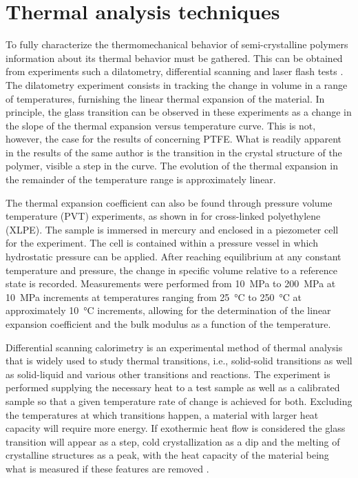 \section{Thermal analysis techniques}

To fully characterize the thermomechanical behavior of semi-crystalline polymers information about its thermal behavior must be gathered.
This can be obtained from experiments such a dilatometry, differential scanning and laser flash tests \citep{blummCharacterizationPTFEUsing2010}.
The dilatometry experiment consists in tracking the change in volume in a range of temperatures, furnishing the linear thermal expansion of the material.
In principle, the glass transition can be observed in these experiments as a change in the slope of the thermal expansion versus temperature curve.
This is not, however, the case for the results of \cite{blummCharacterizationPTFEUsing2010} concerning PTFE.
What is readily apparent in the results of the same author is the transition in the crystal structure of the polymer, visible a step in the curve.
The evolution of the thermal expansion in the remainder of the temperature range is approximately linear.

The thermal expansion coefficient can also be found through pressure volume temperature (PVT) experiments, as shown in \cite{olaszViscoelasticModelCrossLinked2005} for cross-linked polyethylene (XLPE).
The sample is immersed in mercury and enclosed in a piezometer cell for the experiment.
The cell is contained within a pressure vessel in which hydrostatic pressure can be applied.
After reaching equilibrium at any constant temperature and pressure, the change in specific volume relative to a reference state is recorded.
Measurements were performed from \SI{10}{\mega\pascal} to \SI{200}{\mega\pascal} at \SI{10}{\mega\pascal} increments at temperatures ranging from \SI{25}{\celsius} to \SI{250}{\celsius} at approximately \SI{10}{\celsius} increments, allowing for the determination of the linear expansion coefficient and the bulk modulus as a function of the temperature.

Differential scanning calorimetry is an experimental method of thermal analysis that is widely used to study thermal transitions, i.e., solid-solid transitions as well as solid-liquid and various other transitions and reactions.
The experiment is performed supplying the necessary heat to a test sample as well as a calibrated sample so that a given temperature rate of change is achieved for both.
Excluding the temperatures at which transitions happen, a material with larger heat capacity will require more energy.
If exothermic heat flow is considered the glass transition will appear as a step, cold crystallization as a dip and the melting of crystalline structures as a peak, with the heat capacity of the material being what is measured if these features are removed \citep{lukasDifferentialScanningCalorimetry2009}.

